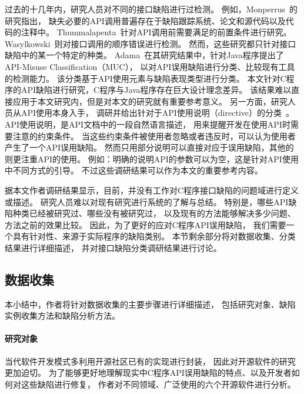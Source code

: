 过去的十几年内，研究人员对不同的接口缺陷进行过检测。
例如，Monperrus~\cite{13-tosem-missing-call}的研究指出，
缺失必要的API调用普遍存在于缺陷跟踪系统、论文和源代码以及代码的注释中。
Thummalapenta~\cite{09-icse-exception}针对API调用前需要满足的前置条件进行研究。
Wasylkowski~\cite{07-fse-object}则对接口调用的顺序错误进行检测。
然而，这些研究都只针对接口缺陷中的某一个特定的种类。
Adama~\cite{survey18}在其研究结果中，针对Java程序提出了API-Misuse Classification（MUC），
以对API误用缺陷进行分类、比较现有工具的检测能力。
该分类基于API使用元素与缺陷表现类型进行分类。
本文针对C程序的API缺陷进行研究，C程序与Java程序存在巨大设计理念差异。
该结果难以直接应用于本文研究内，但是对本文的研究就有重要参考意义。
另一方面，研究人员从API使用本身入手，
调研并给出针对于API使用说明（directive）的分类~\cite{09-icse-doc,12-ese-directive}。
API使用说明，是API文档中的一段自然语言描述，
用来提醒开发在使用API时需要注意的约束条件。
当这些约束条件被使用者忽略或者违反时，可以认为使用者产生了一个API误用缺陷。
然而只用部分说明可以直接对应于误用缺陷，其他的则更注重API的使用。
例如：明确的说明API的参数可以为空，这是针对API使用中不同方式的引导。
不过这些调研结果可以作为本文的重要参考内容。


据本文作者调研结果显示，目前，并没有工作对C程序接口缺陷的问题域进行定义或描述。
研究人员难以对现有研究进行系统的了解与总结。
特别是，哪些API缺陷种类已经被研究过、哪些没有被研究过，
以及现有的方法能够解决多少问题、方法之前的效果比较。
因此，为了更好的应对C程序API误用缺陷，
我们需要一个具有针对性、来源于实际程序的缺陷类别。
本节剩余部分将对数据收集、分类结果进行详细描述，
并对接口缺陷分类调研结果进行讨论。

\subsection{数据收集}
本小结中，作者将针对数据收集的主要步骤进行详细描述，
包括研究对象、缺陷实例收集方法和缺陷分析方法。

\paragraph{研究对象}


当代软件开发模式多利用开源社区已有的实现进行封装，
因此对开源软件的研究更加迫切。
为了能够更好地理解现实中C程序API误用缺陷的特点、以及开发者如何对这些缺陷进行修复，
作者对不同领域、广泛使用的六个开源软件进行分析。


